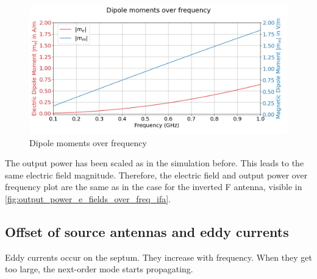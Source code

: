 \begin{figure}[h]
    \centering
    \includegraphics[width=1\linewidth]{Documentation//content//30_simulations//img/dipole_moment_cfm.png}
    \caption{Dipole moments over frequency}
    \label{fig:dipole_moment_cfm}
\end{figure}


The output power has been scaled as in the simulation before. This leads to the same electric field magnitude. Therefore, the electric field and output power over frequency plot are the same as in the case for the inverted F antenna, visible in \autoref{fig:output_power_e_fields_over_freq_ifa}.

\subsection{Offset of source antennas and eddy currents}

Eddy currents occur on the septum. They increase with frequency. When they get too large, the next-order mode starts propagating.

